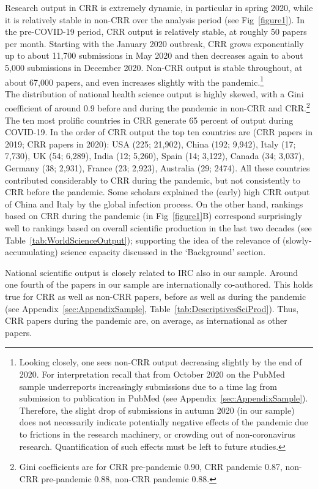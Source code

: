 Research output in CRR is extremely dynamic, in particular in spring 2020, while it is relatively stable in non-CRR over the analysis period (see Fig~\ref{figure1}). In the pre-COVID-19 period, CRR output is relatively stable, at roughly 50 papers per month. Starting  with the January 2020 outbreak, CRR grows exponentially up to about 11,700 submissions in May 2020 and then decreases again to about 5,000 submissions in December 2020. Non-CRR output is stable throughout, at about 67,000 papers, and even increases slightly with the pandemic.\footnote{Looking closely, one sees non-CRR output decreasing slightly by the end of 2020. For interpretation recall that from October 2020 on the PubMed sample underreports increasingly submissions due to a time lag from submission to publication in PubMed (see Appendix~\ref{sec:AppendixSample}). Therefore, the slight drop of submissions in autumn 2020 (in our sample) does not necessarily indicate potentially negative effects of the pandemic due to frictions in the research machinery, or crowding out of non-coronavirus research. Quantification of such effects must be left to future studies.} \\

The distribution of national health science output is highly skewed, with a Gini coefficient of around 0.9 before and during the pandemic in non-CRR and CRR.\footnote{Gini coefficients are for CRR pre-pandemic 0.90, CRR pandemic 0.87, non-CRR pre-pandemic 0.88, non-CRR pandemic 0.88.} The ten most prolific countries in CRR generate 65 percent of output during COVID-19. In the order of CRR output the top ten countries are (CRR papers in 2019; CRR papers in 2020): USA (225; 21,902), China (192; 9,942), Italy (17; 7,730), UK (54; 6,289),  India (12; 5,260), Spain (14; 3,122), Canada (34; 3,037), Germany (38; 2,931), France (23; 2,923), Australia (29; 2474). All these countries contributed considerably to CRR during the pandemic, but not consistently to CRR before the pandemic. Some scholars explained the (early) high CRR output of China and Italy by the global infection process. On the other hand, rankings based on CRR during the pandemic (in Fig~\ref{figure1}B) correspond surprisingly well to rankings based on overall scientific production in the last two decades (see Table~\ref{tab:WorldScienceOutput}); supporting the idea of the relevance of (slowly-accumulating) science capacity discussed in the `Background' section. 

National scientific output is closely related to IRC also in our sample. Around one fourth of the papers in our sample are internationally co-authored. This holds true for CRR as well as non-CRR papers, before as well as during the pandemic (see Appendix~\ref{sec:AppendixSample}, Table~\ref{tab:DescriptivesSciProd}). Thus, CRR papers during the pandemic are, on average, as international as other papers. 

